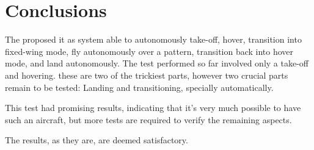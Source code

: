 \chapter{Conclusions} \label{chap:conclusions}

The proposed it as system able to autonomously take-off, hover, transition into fixed-wing mode, fly autonomously over a pattern, transition back into hover mode, and land autonomously.
The test performed so far involved only a take-off and hovering. these are two of the trickiest parts, however two crucial parts remain to be tested: Landing and transitioning, specially automatically.

This test had promising results, indicating that it's very much possible to have such an aircraft, but more tests are required to verify the remaining aspects.

The results, as they are, are deemed satisfactory.